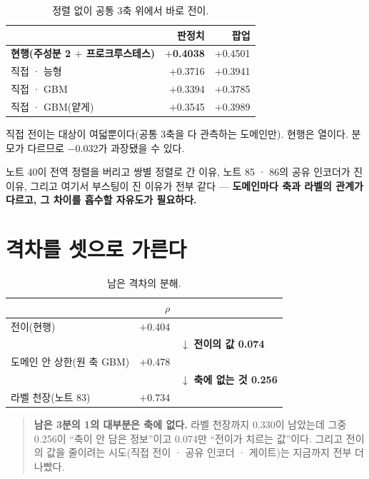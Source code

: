 \documentclass[10pt]{article}
\begin{document}
\begin{table}[t]
\centering\tsize
\caption{정렬 없이 공통 3축 위에서 바로 전이.}
\begin{tabular}{lrr}
\toprule
& 판정치 & 팝업 \\
\midrule
\textbf{현행(주성분 2 $+$ 프로크루스테스)} & \textbf{$+$0.4038} & $+$0.4501 \\
직접 · 능형 & $+$0.3716 & $+$0.3941 \\
직접 · GBM & $+$0.3394 & $+$0.3785 \\
직접 · GBM(얕게) & $+$0.3545 & $+$0.3989 \\
\bottomrule
\end{tabular}
\end{table}

{직접 전이는 대상이 여덟뿐이다(공통 3축을 다 관측하는 도메인만). 현행은 열이다.
분모가 다르므로 $-$0.032가 과장됐을 수 있다.}

노트 40이 전역 정렬을 버리고 쌍별 정렬로 간 이유, 노트 85 · 86의 공유 인코더가
진 이유, 그리고 여기서 부스팅이 진 이유가 전부 같다 --- \textbf{도메인마다
축과 라벨의 관계가 다르고, 그 차이를 흡수할 자유도가 필요하다.}

\section{격차를 셋으로 가른다}

\begin{table}[t]
\centering\tsize
\caption{남은 격차의 분해.}
\begin{tabular}{lrl}
\toprule
& $\rho$ & \\
\midrule
전이(현행) & $+$0.404 & \\
& & $\downarrow$ \textbf{전이의 값 0.074} \\
도메인 안 상한(원 축 GBM) & $+$0.478 & \\
& & $\downarrow$ \textbf{축에 없는 것 0.256} \\
라벨 천장(노트 83) & $+$0.734 & \\
\bottomrule
\end{tabular}
\end{table}

\begin{quote}\fontsize{9.5}{11.5}\selectfont
\textbf{남은 3분의 1의 대부분은 축에 없다.} 라벨 천장까지 0.330이 남았는데
그중 0.256이 ``축이 안 담은 정보''이고 0.074만 ``전이가 치르는 값''이다.
그리고 전이의 값을 줄이려는 시도(직접 전이 · 공유 인코더 · 게이트)는 지금까지
전부 더 나빴다.
\end{quote}
\end{document}
